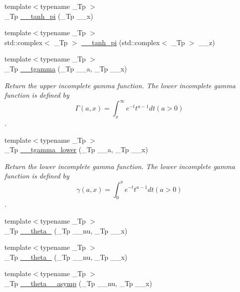\begin{DoxyCompactItemize}
\item 
{\footnotesize template$<$typename \+\_\+\+Tp $>$ }\\\+\_\+\+Tp \hyperlink{namespacestd_1_1____detail_ab0c02d3c15b8297df52b74807f22169b}{\+\_\+\+\_\+tanh\+\_\+pi} (\+\_\+\+Tp \+\_\+\+\_\+x)
\item 
{\footnotesize template$<$typename \+\_\+\+Tp $>$ }\\std\+::complex$<$ \+\_\+\+Tp $>$ \hyperlink{namespacestd_1_1____detail_a75775747d40813d5d54c0b7a7d0c39f0}{\+\_\+\+\_\+tanh\+\_\+pi} (std\+::complex$<$ \+\_\+\+Tp $>$ \+\_\+\+\_\+z)
\item 
{\footnotesize template$<$typename \+\_\+\+Tp $>$ }\\\+\_\+\+Tp \hyperlink{namespacestd_1_1____detail_ad2f6546e22348b07d992d522153d7d6b}{\+\_\+\+\_\+tgamma} (\+\_\+\+Tp \+\_\+\+\_\+a, \+\_\+\+Tp \+\_\+\+\_\+x)
\begin{DoxyCompactList}\small\item\em Return the upper incomplete gamma function. The lower incomplete gamma function is defined by \[ \Gamma(a,x) = \int_x^\infty e^{-t}t^{a-1}dt (a > 0) \]. \end{DoxyCompactList}\item 
{\footnotesize template$<$typename \+\_\+\+Tp $>$ }\\\+\_\+\+Tp \hyperlink{namespacestd_1_1____detail_ad85ad5ffdb1bab9b1e3b6fd7a114fb0d}{\+\_\+\+\_\+tgamma\+\_\+lower} (\+\_\+\+Tp \+\_\+\+\_\+a, \+\_\+\+Tp \+\_\+\+\_\+x)
\begin{DoxyCompactList}\small\item\em Return the lower incomplete gamma function. The lower incomplete gamma function is defined by \[ \gamma(a,x) = \int_0^x e^{-t}t^{a-1}dt (a > 0) \]. \end{DoxyCompactList}\item 
{\footnotesize template$<$typename \+\_\+\+Tp $>$ }\\\+\_\+\+Tp \hyperlink{namespacestd_1_1____detail_af7f54a82d2e5f0d8758cf53ebb2500e8}{\+\_\+\+\_\+theta\+\_} (\+\_\+\+Tp \+\_\+\+\_\+nu, \+\_\+\+Tp \+\_\+\+\_\+x)
\item 
{\footnotesize template$<$typename \+\_\+\+Tp $>$ }\\\+\_\+\+Tp \hyperlink{namespacestd_1_1____detail_ae783991fe49b94dff4ac9e3ebb446d4f}{\+\_\+\+\_\+theta\+\_} (\+\_\+\+Tp \+\_\+\+\_\+nu, \+\_\+\+Tp \+\_\+\+\_\+x)
\item 
{\footnotesize template$<$typename \+\_\+\+Tp $>$ }\\\+\_\+\+Tp \hyperlink{namespacestd_1_1____detail_ac7207ce23916e29df96b3b2159b55150}{\+\_\+\+\_\+theta\+\_\+\_\+asymp} (\+\_\+\+Tp \+\_\+\+\_\+nu, \+\_\+\+Tp \+\_\+\+\_\+x)

\end{DoxyCompactItemize}
